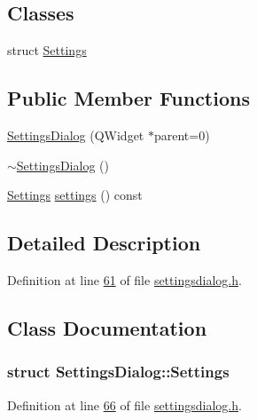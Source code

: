 \subsection*{Classes}
\begin{DoxyCompactItemize}
\item 
struct \hyperlink{a00075_dc/d9a/a00218}{Settings}
\end{DoxyCompactItemize}
\subsection*{Public Member Functions}
\begin{DoxyCompactItemize}
\item 
\hyperlink{a00075_abf4568621eef32ca85b919f2209cdc42}{Settings\+Dialog} (Q\+Widget $\ast$parent=0)
\item 
\hyperlink{a00075_ac48f54d4472902be0a3845a69167f068}{$\sim$\+Settings\+Dialog} ()
\item 
\hyperlink{a00075_dc/d9a/a00218}{Settings} \hyperlink{a00075_afeb533d711d0392b9856c63b40b65ad7}{settings} () const 
\end{DoxyCompactItemize}


\subsection{Detailed Description}


Definition at line \hyperlink{a00132_source_l00061}{61} of file \hyperlink{a00132_source}{settingsdialog.\+h}.



\subsection{Class Documentation}
\label{dc/d9a/a00218}
\hypertarget{a00075_dc/d9a/a00218}{}
\subsubsection{struct Settings\+Dialog\+:\+:Settings}


Definition at line \hyperlink{a00132_source_l00066}{66} of file \hyperlink{a00132_source}{settingsdialog.\+h}.



